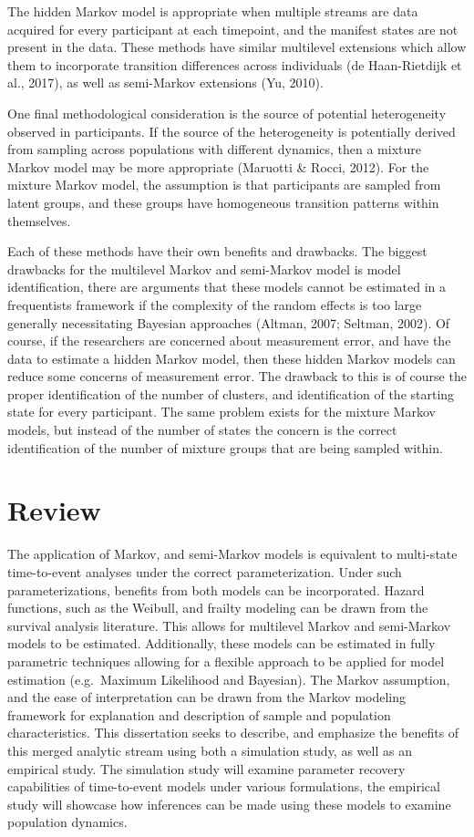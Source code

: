 \documentclass[12pt]{./styles/outhesis}
\begin{document}
The hidden Markov model is appropriate when multiple streams are data
acquired for every participant at each timepoint, and the manifest
states are not present in the data. These methods have similar
multilevel extensions which allow them to incorporate transition
differences across individuals (de Haan-Rietdijk et al., 2017), as well
as semi-Markov extensions (Yu, 2010).

One final methodological consideration is the source of potential
heterogeneity observed in participants. If the source of the
heterogeneity is potentially derived from sampling across populations
with different dynamics, then a mixture Markov model may be more
appropriate (Maruotti \& Rocci, 2012). For the mixture Markov model, the
assumption is that participants are sampled from latent groups, and
these groups have homogeneous transition patterns within themselves.

Each of these methods have their own benefits and drawbacks. The biggest
drawbacks for the multilevel Markov and semi-Markov model is model
identification, there are arguments that these models cannot be
estimated in a frequentists framework if the complexity of the random
effects is too large generally necessitating Bayesian approaches
(Altman, 2007; Seltman, 2002). Of course, if the researchers are
concerned about measurement error, and have the data to estimate a
hidden Markov model, then these hidden Markov models can reduce some
concerns of measurement error. The drawback to this is of course the
proper identification of the number of clusters, and identification of
the starting state for every participant. The same problem exists for
the mixture Markov models, but instead of the number of states the
concern is the correct identification of the number of mixture groups
that are being sampled within.

\section{Review}
The application of Markov, and semi-Markov models is equivalent to multi-state
time-to-event analyses under the correct parameterization. Under such parameterizations, benefits
from both models can be incorporated.
Hazard functions, such as the Weibull, and frailty modeling
can be drawn from the survival analysis literature. This allows for multilevel Markov and semi-Markov models to be estimated. Additionally, these
models can be estimated in fully parametric techniques allowing for a
flexible approach to be applied for model estimation (e.g.~Maximum
Likelihood and Bayesian). The Markov assumption, and the ease of
interpretation can be drawn from the Markov modeling framework for
explanation and description of sample and population characteristics.
This dissertation seeks to describe, and emphasize the benefits of this
merged analytic stream using both a simulation study, as well as an
empirical study. The simulation study will examine parameter recovery
capabilities of time-to-event models under various formulations, the
empirical study will showcase how inferences can be made using these
models to examine population dynamics.
\end{document}
